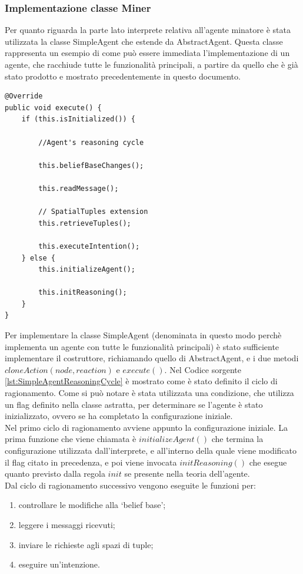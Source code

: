 \subsubsection{Implementazione classe Miner}
Per quanto riguarda la parte lato interprete relativa all'agente minatore è stata utilizzata la classe SimpleAgent che estende da AbstractAgent. Questa classe rappresenta un esempio di come può essere immediata l'implementazione di un agente, che racchiude tutte le funzionalità principali, a partire da quello che è già stato prodotto e mostrato precedentemente in questo documento.
\medskip
\begin{lstlisting}[firstnumber=1,label={lst:SimpleAgentReasoningCycle},caption={Ciclo di ragionamento per l'agente completo}]
@Override
public void execute() {
    if (this.isInitialized()) {
    
        //Agent's reasoning cycle
    
        this.beliefBaseChanges();
    
        this.readMessage();
    
        // SpatialTuples extension
        this.retrieveTuples();
    
        this.executeIntention();
    } else {
        this.initializeAgent();
        
        this.initReasoning();
    }
}
\end{lstlisting}
Per implementare la classe SimpleAgent (denominata in questo modo perchè implementa un agente con tutte le funzionalità principali) è stato sufficiente implementare il costruttore, richiamando quello di AbstractAgent, e i due metodi $cloneAction(node, reaction)$ e $execute()$.
Nel Codice sorgente \ref{lst:SimpleAgentReasoningCycle} è mostrato come è stato definito il ciclo di ragionamento.
Come si può notare è stata utilizzata una condizione, che utilizza un flag definito nella classe astratta, per determinare se l'agente è stato inizializzato, ovvero se ha completato la configurazione iniziale.
\\
Nel primo ciclo di ragionamento avviene appunto la configurazione iniziale. La prima funzione che viene chiamata è $initializeAgent()$ che termina la configurazione utilizzata dall'interprete, e all'interno della quale viene modificato il flag citato in precedenza, e poi viene invocata $initReasoning()$ che esegue quanto previsto dalla regola $init$ se presente nella teoria dell'agente.
\\
Dal ciclo di ragionamento successivo vengono eseguite le funzioni per:
\begin{enumerate}
\item controllare le modifiche alla `belief base';
\item leggere i messaggi ricevuti;
\item inviare le richieste agli spazi di tuple;
\item eseguire un'intenzione.
\end{enumerate}
